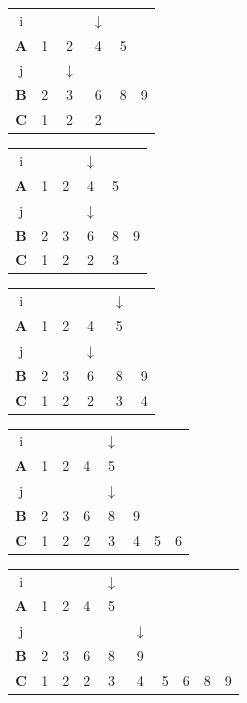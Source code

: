 \documentclass[a4paper, 11pt]{article}
\begin{document}
\begin{center}
	\begin{tabular}{ c c c c c c }
		i & & & $\downarrow$\\
		\textbf{A} & 1 & 2 & 4 & 5\\
		j & & $\downarrow$\\
		\textbf{B} & 2 & 3 & 6 & 8 & 9\\
		\textbf{C} & 1 & 2 & 2\\
	\end{tabular}
\end{center}

\begin{center}
	\begin{tabular}{ c c c c c c }
		i & & & $\downarrow$\\
		\textbf{A} & 1 & 2 & 4 & 5\\
		j & & & $\downarrow$\\
		\textbf{B} & 2 & 3 & 6 & 8 & 9\\
		\textbf{C} & 1 & 2 & 2 & 3\\
	\end{tabular}
\end{center}

\begin{center}
	\begin{tabular}{ c c c c c c }
		i & & & & $\downarrow$\\
		\textbf{A} & 1 & 2 & 4 & 5\\
		j & & & $\downarrow$\\
		\textbf{B} & 2 & 3 & 6 & 8 & 9\\
		\textbf{C} & 1 & 2 & 2 & 3 & 4\\
	\end{tabular}
\end{center}

\begin{center}
	\begin{tabular}{ c c c c c c c c}
		i & & & & $\downarrow$\\
		\textbf{A} & 1 & 2 & 4 & 5\\
		j & & & & $\downarrow$\\
		\textbf{B} & 2 & 3 & 6 & 8 & 9\\
		\textbf{C} & 1 & 2 & 2 & 3 & 4 & 5 & 6\\
	\end{tabular}
\end{center}

\begin{center}
	\begin{tabular}{c c c c c c c c c c}
		i & & & & $\downarrow$\\
		\textbf{A} & 1 & 2 & 4 & 5\\
		j & & & & & $\downarrow$\\
		\textbf{B} & 2 & 3 & 6 & 8 & 9\\
		\textbf{C} & 1 & 2 & 2 & 3 & 4 & 5 & 6 & 8 & 9\\
	\end{tabular}
\end{center}
\end{document}

